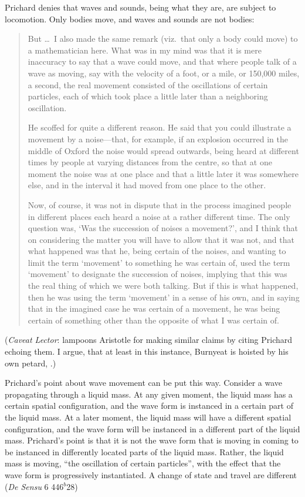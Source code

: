 Prichard denies that waves and sounds, being what they are, are subject to locomotion. Only bodies move, and waves and sounds are not bodies:
\begin{quotation}
	But \dots\ I also made the same remark (viz.\ that only a body could move) to a mathematician here. What was in my mind was that it is mere inaccuracy to say that a wave could move, and that where people talk of a wave as moving, say with the velocity of a foot, or a mile, or 150,000 miles, a second, the real movement consisted of the oscillations of certain particles, each of which took place a little later than a neighboring oscillation.
	
	He scoffed for quite a different reason. He said that you could illustrate a movement by a noise---that, for example, if an explosion occurred in the middle of Oxford the noise would spread outwards, being heard at different times by people at varying distances from the centre, so that at one moment the noise was at one place and that a little later it was somewhere else, and in the interval it had moved from one place to the other.
	
	Now, of course, it was not in dispute that in the process imagined people in different places each heard a noise at a rather different time. The only question was, `Was the succession of noises a movement?', and I think that on considering the matter you will have to allow that it was not, and that what happened was that he, being certain of the noises, and wanting to limit the term `movement' to something he was certain of, used the term `movement' to designate the succession of noises, implying that this was the real thing of which we were both talking. But if this is what happened, then he was using the term `movement' in a sense of his own, and in saying that in the imagined case he was certain of a movement, he was being certain of something other than the opposite of what I was certain of. \citep[99]{Prichard:1950kx}
\end{quotation}
(\emph{Caveat Lector}: \citealt[430 n. 29; appendix,]{Burnyeat:1995fk} lampoons Aristotle for making similar claims by citing Prichard echoing them. I argue, that at least in this instance, Burnyeat is hoisted by his own petard, \citealt[chapter 3.2]{Kalderon:2015fr}.)

Prichard's point about wave movement can be put this way. Consider a wave propagating through a liquid mass. At any given moment, the liquid mass has a certain spatial configuration, and the wave form is instanced in a certain part of the liquid mass. At a later moment, the liquid mass will have a different spatial configuration, and the wave form will be instanced in a different part of the liquid mass. Prichard's point is that it is not the wave form that is moving in coming to be instanced in differently located parts of the liquid mass. Rather, the liquid mass is moving, ``the oscillation of certain particles'', with the effect that the wave form is progressively instantiated. A change of state and travel are different (\emph{De Sensu} 6 446\( ^{b} \)28)

